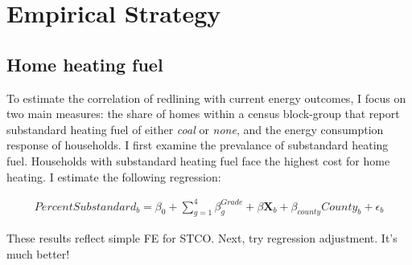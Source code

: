 \documentclass[
]{article}
\begin{document}
\hypertarget{empirical-strategy}{%
\section{Empirical Strategy}\label{empirical-strategy}}

\hypertarget{home-heating-fuel}{%
\subsection{Home heating fuel}\label{home-heating-fuel}}

To estimate the correlation of redlining with current energy outcomes, I focus on two main measures: the share of homes within a census block-group that report substandard heating fuel of either \textit{coal} or \textit{none}, and the energy consumption response of households. I first examine the prevalance of substandard heating fuel. Households with substandard heating fuel face the highest cost for home heating. I estimate the following regression:

\begin{eqnarray}
PercentSubstandard_{b} = \beta_0 + \sum_{g=1}^4 \beta_{g}^{Grade} +  \beta \mathbf{X}_b + \beta_{county} County_b + \epsilon_{b} \label{mainSubtandard1}
\end{eqnarray}

These results reflect simple FE for STCO. Next, try regression adjustment. It's much better!
\end{document}
